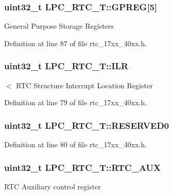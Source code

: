 \subsubsection[{\texorpdfstring{G\+P\+R\+EG}{GPREG}}]{ uint32\+\_\+t L\+P\+C\+\_\+\+R\+T\+C\+\_\+\+T\+::\+G\+P\+R\+EG\mbox{[}5\mbox{]}}\hypertarget{structLPC__RTC__T_a6624a04c6db73e0f9e53a9bc3cf50c1a}{}\label{structLPC__RTC__T_a6624a04c6db73e0f9e53a9bc3cf50c1a}
General Purpose Storage Registers 

Definition at line 87 of file rtc\+\_\+17xx\+\_\+40xx.\+h.

\subsubsection[{\texorpdfstring{I\+LR}{ILR}}]{ uint32\+\_\+t L\+P\+C\+\_\+\+R\+T\+C\+\_\+\+T\+::\+I\+LR}\hypertarget{structLPC__RTC__T_a6e1debaa7074a0fae4767a70f9abff29}{}\label{structLPC__RTC__T_a6e1debaa7074a0fae4767a70f9abff29}
$<$ R\+TC Structure Interrupt Location Register 

Definition at line 79 of file rtc\+\_\+17xx\+\_\+40xx.\+h.

\subsubsection[{\texorpdfstring{R\+E\+S\+E\+R\+V\+E\+D0}{RESERVED0}}]{ uint32\+\_\+t L\+P\+C\+\_\+\+R\+T\+C\+\_\+\+T\+::\+R\+E\+S\+E\+R\+V\+E\+D0}\hypertarget{structLPC__RTC__T_a94d0c8bf3402d34aac9170bac01bb4fb}{}\label{structLPC__RTC__T_a94d0c8bf3402d34aac9170bac01bb4fb}


Definition at line 80 of file rtc\+\_\+17xx\+\_\+40xx.\+h.

\subsubsection[{\texorpdfstring{R\+T\+C\+\_\+\+A\+UX}{RTC_AUX}}]{ uint32\+\_\+t L\+P\+C\+\_\+\+R\+T\+C\+\_\+\+T\+::\+R\+T\+C\+\_\+\+A\+UX}\hypertarget{structLPC__RTC__T_ab476d508c9ea87e71724c30d36ece294}{}\label{structLPC__RTC__T_ab476d508c9ea87e71724c30d36ece294}
R\+TC Auxiliary control register 

